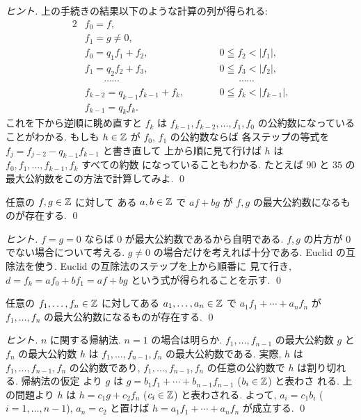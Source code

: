 \documentclass[12pt,twoside]{jarticle}
\begin{document}
\begin{proof}[ヒント]
上の手続きの結果以下のような計算の列が得られる:
\begin{alignat*}{2}
  & f_0 = f, & & \\
  & f_1 = g \ne 0, & & \\
  & f_0 = q_1f_1 + f_2, & \qquad & 0\leqq f_2 < |f_1|, \\
  & f_1 = q_2f_2 + f_3, & \qquad & 0\leqq f_3 < |f_2|, \\
  & \qquad \cdots\cdots & \qquad & \qquad\cdots\cdots \\
  & f_{k-2} = q_{k-1}f_{k-1} + f_k, & \qquad & 0\leqq f_k < |f_{k-1}|, \\
  & f_{k-1} = q_kf_k. & & 
\end{alignat*}
これを下から逆順に眺め直すと $f_k$ は $f_{k-1},f_{k-2},\dots,f_1,f_0$ 
の公約数になっていることがわかる.  
もしも $h\in {\mathbb Z}$ が $f_0$, $f_1$ の公約数ならば
各ステップの等式を $f_j = f_{j-2} - q_{k-1}f_{k-1}$ と書き直して
上から順に見て行けば $h$ は $f_0,f_1,\dots,f_{k-1},f_k$ すべての約数
になっていることもわかる.
たとえば $90$ と $35$ の最大公約数をこの方法で計算してみよ.
\qed
\end{proof}


\begin{question}[5点]
\label{q:Euclidean-algorithm-2-Z}
 任意の $f,g\in{\mathbb Z}$ に対して
 ある $a,b\in{\mathbb Z}$ で $af + bg$ が $f,g$ の最大公約数になるものが存在する.
 \qed
\end{question}

\begin{proof}[ヒント]
 $f=g=0$ ならば $0$ が最大公約数であるから自明である.
 $f,g$ の片方が $0$ でない場合について考える.
 $g\ne 0$ の場合だけを考えれば十分である.
 Euclid の互除法を使う.  Euclid の互除法のステップを上から順番に
 見て行き, $d=f_k=af_0+bf_1=af+bg$ という式が得られることを示す.
 \qed
\end{proof}


\begin{question}[5点]
\label{q:Euclidean-algorithm-3-Z}
 任意の $f_1,\ldots,f_n\in{\mathbb Z}$ に対してある $a_1,\ldots,a_n\in{\mathbb Z}$ で %
 $a_1f_1 + \cdots + a_nf_n$ が $f_1,\ldots,f_n$ の最大公約数になるものが存在する.
 \qed
\end{question}

\begin{proof}[ヒント]
$n$ に関する帰納法.  $n=1$ の場合は明らか. 
$f_1,\dots,f_{n-1}$ の最大公約数 $g$ と $f_n$ の最大公約数 $h$ 
は $f_1,\dots,f_{n-1},f_n$ の最大公約数である. 
実際, $h$ は $f_1,\dots,f_{n-1},f_n$ の公約数であり, 
$f_1,\dots,f_{n-1},f_n$ の任意の公約数で $h$ は割り切れる.  帰納法の仮定
より $g$ は $g=b_1f_1+\cdots+b_{n-1}f_{n-1}$ ($b_i\in{\mathbb Z}$) と表わさ
れる. 上の問題より $h$ は $h=c_1g+c_2f_n$ 
($c_i\in{\mathbb Z}$) と表わされる.  よって, $a_i=c_1b_i$ ($i=1,\dots,n-1$), 
$a_n=c_2$ と置けば $h = a_1f_1+\cdots+a_nf_n$ が成立する.
\qed
\end{proof}
\end{document}
